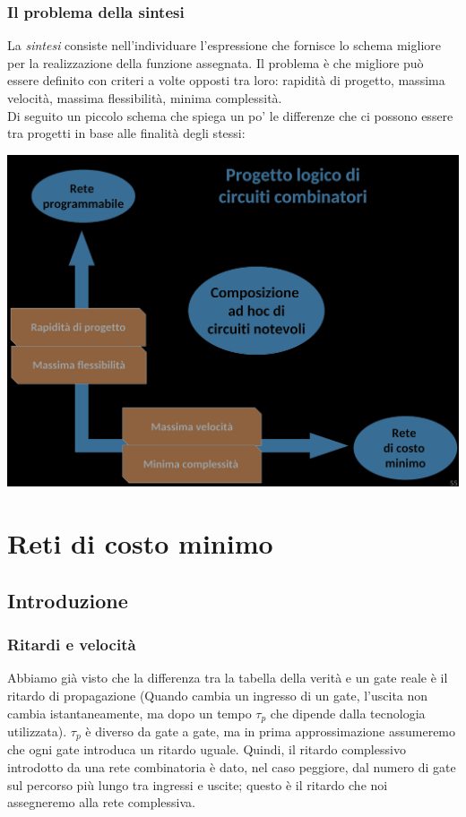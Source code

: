 \documentclass{article}
\begin{document}
\subsubsection{Il problema della sintesi}
La \textit{sintesi} consiste nell'individuare l'espressione che fornisce lo schema migliore per la realizzazione della funzione assegnata. Il problema è che migliore può essere definito con criteri a volte opposti tra loro: rapidità di progetto, massima velocità, massima flessibilità, minima complessità.
\vspace{0.2cm}\\
Di seguito un piccolo schema che spiega un po' le differenze che ci possono essere tra progetti in base alle finalità degli stessi:
\begin{center}
    \includegraphics[scale=0.3]{proglog.png}
\end{center}
\section{Reti di costo minimo}
\subsection{Introduzione}
\subsubsection{Ritardi e velocità}
Abbiamo già visto che la differenza tra la tabella della verità e un gate reale è il ritardo di propagazione (Quando cambia un ingresso di un gate, l'uscita non cambia istantaneamente, ma dopo un tempo $\tau_p$ che dipende dalla tecnologia utilizzata). $\tau_p$ è diverso da gate a gate, ma in prima approssimazione assumeremo che ogni gate introduca un ritardo uguale. Quindi, il ritardo complessivo introdotto da una rete combinatoria è dato, nel caso peggiore, dal numero di gate sul percorso più lungo tra ingressi e uscite; questo è il ritardo che noi assegneremo alla rete complessiva.
\end{document}

